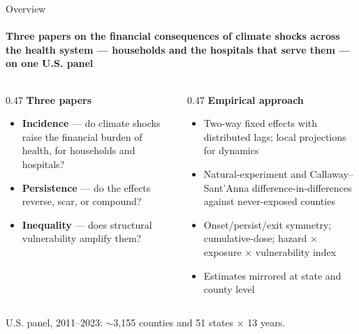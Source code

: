 \documentclass[aspectratio=169,11pt]{beamer}
\newcommand{\emphcolor}[1]{{\color{WarmOrange}\textbf{#1}}}
\newcommand{\tealtext}[1]{{\color{Teal}#1}}
\newcommand{\graytext}[1]{{\color{WarmGray}#1}}
\begin{document}
\begin{frame}{Overview}
  \framesubtitle{Three papers on the financial consequences of climate shocks across the health system --- households and the hospitals that serve them --- on one U.S. panel}
  \begin{columns}[T]
    \begin{column}{0.47\textwidth}
      \textbf{\tealtext{Three papers}}
      \begin{itemize}\itemsep0.18em
        \item \emphcolor{Incidence} --- do climate shocks raise the financial burden of health, for households and hospitals?
        \item \emphcolor{Persistence} --- do the effects reverse, scar, or compound?
        \item \emphcolor{Inequality} --- does structural vulnerability amplify them?
      \end{itemize}
    \end{column}
    \begin{column}{0.47\textwidth}
      \textbf{\tealtext{Empirical approach}}
      \begin{itemize}\itemsep0.18em
        \item Two-way fixed effects with distributed lags; local projections for dynamics
        \item Natural-experiment and Callaway--Sant'Anna difference-in-differences against never-exposed counties
        \item Onset/persist/exit symmetry; cumulative-dose; hazard \(\times\) exposure \(\times\) vulnerability index
        \item Estimates mirrored at state and county level
      \end{itemize}
    \end{column}
  \end{columns}
  \vspace{0.2em}
  \begin{center}
    \graytext{\scriptsize U.S. panel, 2011--2023: $\sim$3{,}155 counties and 51 states $\times$ 13 years.}
  \end{center}
\end{frame}
\end{document}
